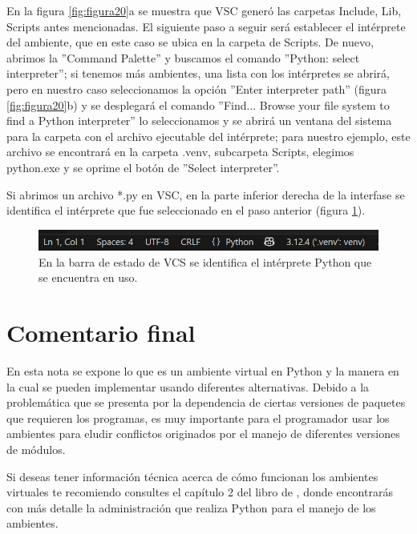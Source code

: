 \documentclass{article}
\begin{document}
	En la figura \ref{fig:figura20}a se muestra que VSC generó las carpetas Include, Lib, Scripts antes mencionadas. El siguiente paso a seguir será establecer el intérprete del ambiente, que en este caso se ubica en la carpeta de Scripts. De nuevo, abrimos la ''Command Palette'' y buscamos el comando ''Python: select interpreter''; si tenemos más ambientes, una lista con los intérpretes se abrirá, pero en nuestro caso seleccionamos la opción ''Enter interpreter path'' (figura \ref{fig:figura20}b) y se desplegará el comando ''Find... Browse your file system to find a Python interpreter'' lo seleccionamos y se abrirá un ventana del sistema para la carpeta con el archivo ejecutable del intérprete; para nuestro ejemplo, este archivo se encontrará en la carpeta .venv, subcarpeta Scripts, elegimos python.exe y se oprime el botón de ''Select interpreter''. \bigskip  
	
	Si abrimos un archivo *.py en VSC, en la parte inferior derecha de la interfase se identifica el intérprete que fue seleccionado en el paso anterior (figura \ref{fig:figura21}).
	
	\begin{figure}[H]
		\centering
		\includegraphics[width=0.7\linewidth]{Figura21}
		\caption{En la barra de estado de VCS se identifica el intérprete Python que se encuentra en uso.}
		\label{fig:figura21}
	\end{figure}
	
	\section{Comentario final}
	En esta nota se expone lo que es un ambiente virtual en Python y la manera en la cual se pueden implementar usando diferentes alternativas. Debido a la problemática que se presenta por la dependencia de ciertas versiones de paquetes que requieren los programas, es muy importante para el programador usar los ambientes para eludir conflictos originados por el manejo de diferentes versiones de módulos.\bigskip  
	
	Si deseas tener información técnica acerca de cómo funcionan los ambientes virtuales te recomiendo consultes el capítulo 2 del libro de \citet{jolowicz2024}, donde encontrarás con más detalle la administración que realiza Python para el manejo de los ambientes.
	
\end{document}
